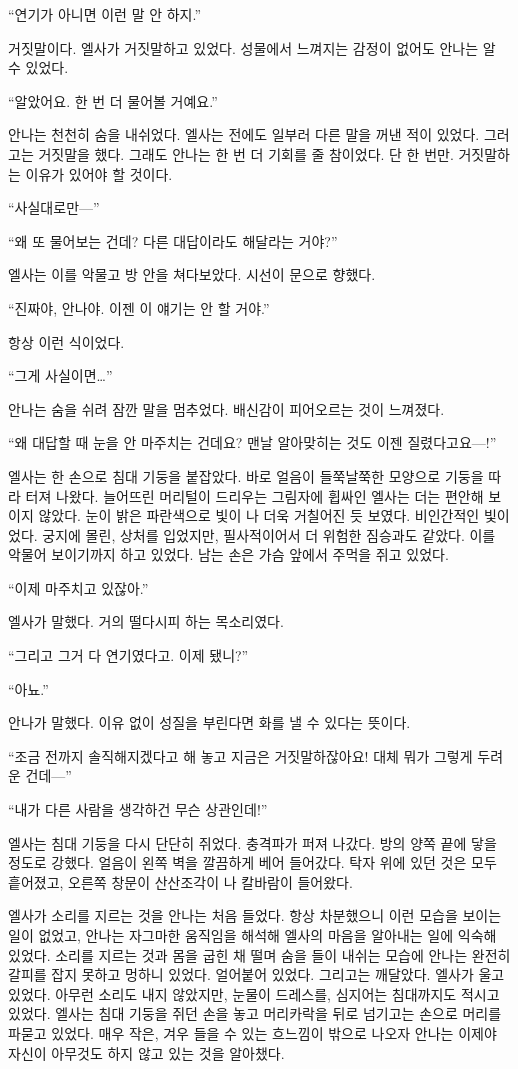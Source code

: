 ``연기가 아니면 이런 말 안 하지.''

거짓말이다. 엘사가 거짓말하고 있었다. 성물에서 느껴지는 감정이 없어도 안나는 알 수 있었다.

``알았어요. 한 번 더 물어볼 거예요.''

안나는 천천히 숨을 내쉬었다. 엘사는 전에도 일부러 다른 말을 꺼낸 적이 있었다. 그러고는 거짓말을 했다. 그래도 안나는 한 번 더 기회를 줄 참이었다. 단 한 번만. 거짓말하는 이유가 있어야 할 것이다.

``사실대로만—''

``왜 또 물어보는 건데? 다른 대답이라도 해달라는 거야?''

엘사는 이를 악물고 방 안을 쳐다보았다. 시선이 문으로 향했다.

``진짜야, 안나야. 이젠 이 얘기는 안 할 거야.''

항상 이런 식이었다.

``그게 사실이면\ldots''

안나는 숨을 쉬려 잠깐 말을 멈추었다. 배신감이 피어오르는 것이 느껴졌다.

``왜 대답할 때 눈을 안 마주치는 건데요? 맨날 알아맞히는 것도 이젠 질렸다고요—!''

엘사는 한 손으로 침대 기둥을 붙잡았다. 바로 얼음이 들쭉날쭉한 모양으로 기둥을 따라 터져 나왔다. 늘어뜨린 머리털이 드리우는 그림자에 휩싸인 엘사는 더는 편안해 보이지 않았다. 눈이 밝은 파란색으로 빛이 나 더욱 거칠어진 듯 보였다. 비인간적인 빛이었다. 궁지에 몰린, 상처를 입었지만, 필사적이어서 더 위험한 짐승과도 같았다. 이를 악물어 보이기까지 하고 있었다. 남는 손은 가슴 앞에서 주먹을 쥐고 있었다.

``이제 마주치고 있잖아.''

엘사가 말했다. 거의 떨다시피 하는 목소리였다.

``그리고 그거 다 연기였다고. 이제 됐니?''

``아뇨.''

안나가 말했다. 이유 없이 성질을 부린다면 화를 낼 수 있다는 뜻이다.

``조금 전까지 솔직해지겠다고 해 놓고 지금은 거짓말하잖아요! 대체 뭐가 그렇게 두려운 건데—''

``내가 다른 사람을 생각하건 무슨 상관인데!''

엘사는 침대 기둥을 다시 단단히 쥐었다. 충격파가 퍼져 나갔다. 방의 양쪽 끝에 닿을 정도로 강했다. 얼음이 왼쪽 벽을 깔끔하게 베어 들어갔다. 탁자 위에 있던 것은 모두 흩어졌고, 오른쪽 창문이 산산조각이 나 칼바람이 들어왔다.

엘사가 소리를 지르는 것을 안나는 처음 들었다. 항상 차분했으니 이런 모습을 보이는 일이 없었고, 안나는 자그마한 움직임을 해석해 엘사의 마음을 알아내는 일에 익숙해 있었다. 소리를 지르는 것과 몸을 굽힌 채 떨며 숨을 들이 내쉬는 모습에 안나는 완전히 갈피를 잡지 못하고 멍하니 있었다. 얼어붙어 있었다. 그리고는 깨달았다. 엘사가 울고 있었다. 아무런 소리도 내지 않았지만, 눈물이 드레스를, 심지어는 침대까지도 적시고 있었다. 엘사는 침대 기둥을 쥐던 손을 놓고 머리카락을 뒤로 넘기고는 손으로 머리를 파묻고 있었다. 매우 작은, 겨우 들을 수 있는 흐느낌이 밖으로 나오자 안나는 이제야 자신이 아무것도 하지 않고 있는 것을 알아챘다.

